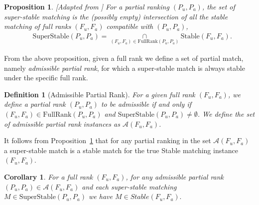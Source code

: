 \documentclass{article}
\newtheorem{corollary}{Corollary}[theorem]
\newtheorem{proposition}[theorem]{Proposition}
\newtheorem{definition}{Definition}
\begin{document}
\begin{proposition}\label{prop:spieker}[Adapted from \cite{spieker1995set}]
    For a  partial ranking $(P_{u}, P_{a})$, the set of super-stable matching is the (possibly empty) intersection of all the stable matching of full ranks $(F_u, F_a)$ compatible with $(P_{u},P_{a})$, 
    \begin{align*}
    &\mathrm{SuperStable}(P_{u}, P_{a}) = \underset{(F_{u},F_{a}) \in \mathrm{FullRank}(P_{u}, P_{a})}{\cap} \mathrm{Stable}(F_{u}, F_{a}).
    \end{align*}
\end{proposition}
From the above proposition, given a full rank we define a set of partial match, namely {\em admissible partial rank}, for which a super-stable match is always stable under the specific full rank. 
\begin{definition}[Admissible Partial Rank]
    For a given full rank $(F_{u}, F_{a})$, we define a partial rank  $(P_u, P_a)$ to be \emph{admissible} if and only if $(F_{u}, F_{a}) \in \mathrm{FullRank}(P_{u}, P_{a})$ and $\mathrm{SuperStable}(P_{u}, P_{a}) \neq \emptyset$. We define the set of admissible partial rank instances as $\mathcal{A}(F_{u}, F_{a})$.
\end{definition}

It follows from Proposition~\ref{prop:spieker} that for any partial ranking in the set $\mathcal{A}(F_{u}, F_{a})$ a super-stable match is a stable match for the true Stable matching instance $(F_{u}, F_{a})$.
\begin{corollary}\label{corr:super-stable}
   For a full rank $(F_{u}, F_{a})$, for any admissible partial rank $(P_{u},P_{a}) \in \mathcal{A}(F_{u}, F_{a})$ and each super-stable matching
   $M \in \mathrm{SuperStable}(P_{u}, P_{a})$ we have $M \in Stable(F_{u}, F_{a}).$
\end{corollary}

\end{document}
